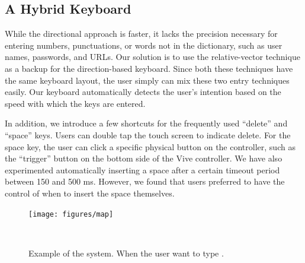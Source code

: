 \subsection{A Hybrid Keyboard}

While the directional approach is faster, it lacks the precision necessary for entering numbers, punctuations, or words not in the dictionary, such as user names, passwords, and URLs.   Our solution is to use the relative-vector technique as a backup for the direction-based keyboard.  Since both these techniques have the same keyboard layout, the user simply can mix these two entry techniques easily.  Our keyboard automatically detects the user’s intention based on the speed with which the keys are entered. 

In addition, we introduce a few shortcuts for the frequently used “delete” and “space” keys.   Users can double tap the touch screen to indicate delete.  For the space key, the user can click a specific physical button on the controller, such as the “trigger” button on the bottom side of the Vive controller.  We have also experimented automatically inserting a space after a certain timeout period between 150 and 500 ms.  However, we found that users preferred to have the control of when to insert the space themselves.   

\begin{figure}
  \centering
  \texttt{[image: figures/map]}
  \caption{Example of the system.  When the user want to type .}
  ~\label{fig:example}
\end{figure}

